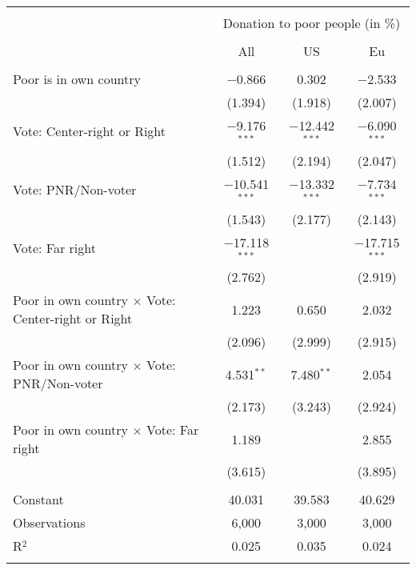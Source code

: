 
\begin{tabular}{@{\extracolsep{5pt}}lccc} 
\\[-1.8ex]\hline 
\hline \\[-1.8ex] 
 & \multicolumn{3}{c}{Donation to poor people (in \%)} \\ 
\cline{2-4} 
\\[-1.8ex] & All & US & Eu \\ 
\hline \\[-1.8ex] 
 Poor is in own country & $-$0.866 & 0.302 & $-$2.533 \\ 
  & (1.394) & (1.918) & (2.007) \\ 
  Vote: Center-right or Right & $-$9.176$^{***}$ & $-$12.442$^{***}$ & $-$6.090$^{***}$ \\ 
  & (1.512) & (2.194) & (2.047) \\ 
  Vote: PNR/Non-voter & $-$10.541$^{***}$ & $-$13.332$^{***}$ & $-$7.734$^{***}$ \\ 
  & (1.543) & (2.177) & (2.143) \\ 
  Vote: Far right & $-$17.118$^{***}$ &  & $-$17.715$^{***}$ \\ 
  & (2.762) &  & (2.919) \\ 
  Poor in own country $\times$ Vote: Center-right or Right & 1.223 & 0.650 & 2.032 \\ 
  & (2.096) & (2.999) & (2.915) \\ 
  Poor in own country $\times$ Vote: PNR/Non-voter & 4.531$^{**}$ & 7.480$^{**}$ & 2.054 \\ 
  & (2.173) & (3.243) & (2.924) \\ 
  Poor in own country $\times$ Vote: Far right & 1.189 &  & 2.855 \\ 
  & (3.615) &  & (3.895) \\ 
 \hline \\[-1.8ex] 
Constant & 40.031 & 39.583 & 40.629 \\ 
Observations & 6,000 & 3,000 & 3,000 \\ 
R$^{2}$ & 0.025 & 0.035 & 0.024 \\ 
\hline 
\hline \\[-1.8ex] 
\end{tabular} 